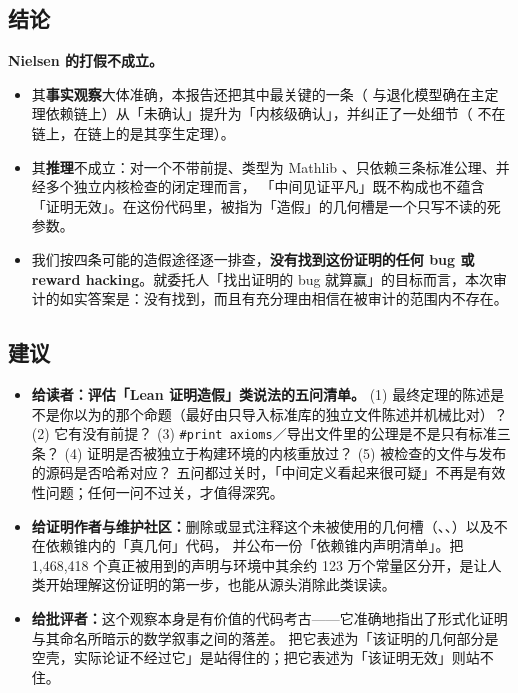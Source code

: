\subsection{结论}

\begin{verdictbox}
\textbf{Nielsen 的打假不成立。}

\begin{itemize}
\item 其\textbf{事实观察}大体准确，本报告还把其中最关键的一条（ 与退化模型确在主定理依赖链上）从「未确认」提升为「内核级确认」，并纠正了一处细节（ 不在链上，在链上的是其孪生定理）。
\item 其\textbf{推理}不成立：对一个不带前提、类型为 Mathlib 、只依赖三条标准公理、并经多个独立内核检查的闭定理而言，
「中间见证平凡」既不构成也不蕴含「证明无效」。在这份代码里，被指为「造假」的几何槽是一个只写不读的死参数。
\item 我们按四条可能的造假途径逐一排查，\textbf{没有找到这份证明的任何 bug 或 reward hacking}。就委托人「找出证明的 bug 就算赢」的目标而言，本次审计的如实答案是：没有找到，而且有充分理由相信在被审计的范围内不存在。
\end{itemize}
\end{verdictbox}

\subsection{建议}

\begin{itemize}
\item \textbf{给读者：评估「Lean 证明造假」类说法的五问清单。}
(1) 最终定理的陈述是不是你以为的那个命题（最好由只导入标准库的独立文件陈述并机械比对）？
(2) 它有没有前提？
(3) \texttt{\#print axioms}／导出文件里的公理是不是只有标准三条？
(4) 证明是否被独立于构建环境的内核重放过？
(5) 被检查的文件与发布的源码是否哈希对应？
五问都过关时，「中间定义看起来很可疑」不再是有效性问题；任何一问不过关，才值得深究。
\item \textbf{给证明作者与维护社区：}删除或显式注释这个未被使用的几何槽（、、）以及不在依赖锥内的「真几何」代码，
并公布一份「依赖锥内声明清单」。把 1,468,418 个真正被用到的声明与环境中其余约 123 万个常量区分开，是让人类开始理解这份证明的第一步，也能从源头消除此类误读。
\item \textbf{给批评者：}这个观察本身是有价值的代码考古——它准确地指出了形式化证明与其命名所暗示的数学叙事之间的落差。
把它表述为「该证明的几何部分是空壳，实际论证不经过它」是站得住的；把它表述为「该证明无效」则站不住。
\end{itemize}

